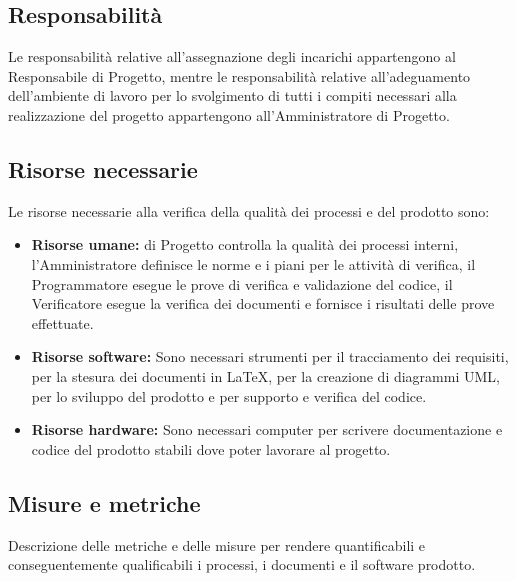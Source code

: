 	\subsection{Responsabilità}
	Le responsabilità relative all'assegnazione degli incarichi appartengono al Responsabile di Progetto, mentre le responsabilità relative all'adeguamento dell'ambiente di lavoro per lo svolgimento di tutti i compiti necessari alla realizzazione del progetto appartengono all'Amministratore di Progetto.

	\subsection{Risorse necessarie}
	Le risorse necessarie alla verifica della qualità dei processi e del prodotto sono:
		\begin{itemize}
  			\item \textbf{Risorse umane:} \textnormal{di Progetto controlla la qualità dei processi interni, l'Amministratore definisce le norme e i piani per le attività di verifica, il Programmatore esegue le prove di verifica e validazione del codice, il Verificatore esegue la verifica dei documenti e fornisce i risultati delle prove effettuate.}
  			\item \textbf{Risorse software:} \textnormal{Sono necessari strumenti per il tracciamento dei requisiti, per la stesura dei documenti in \LaTeX, per la creazione di diagrammi UML, per lo sviluppo del prodotto e per supporto e verifica del codice.}
  			\item \textbf{Risorse hardware:} \textnormal{Sono necessari computer per scrivere documentazione e codice del prodotto stabili dove poter lavorare al progetto.}
		\end{itemize}
		
	\subsection{Misure e metriche}
	Descrizione delle metriche e delle misure per rendere quantificabili e conseguentemente qualificabili i processi, i documenti e il software prodotto.

